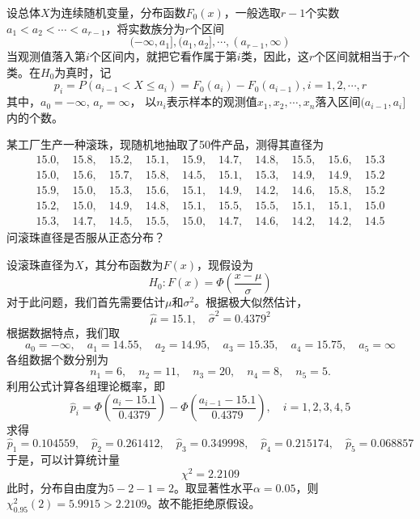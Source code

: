 设总体$X$为连续随机变量，分布函数$F_0(x)$，一般选取$r-1$个实数$a_1<a_2<\cdots<a_{r-1}$，将实数族分为$r$个区间
$$
(-\infty, a_1],(a_1,a_2],\cdots, (a_{r-1},\infty)
$$
当观测值落入第$i$个区间内，就把它看作属于第$i$类，因此，这$r$个区间就相当于$r$个类。在$H_0$为真时，记
$$p_i = P(a_{i-1} < X \leq a_i ) = F_0(a_i) - F_0(a_{i-1}) ,i=1,2,\cdots,r $$
其中，$a_0 = -\infty$, $a_{r} = \infty$， 以$n_i$表示样本的观测值$x_1,x_2,\cdots,x_n$落入区间$(a_{i-1},a_i]$内的个数。
\begin{example}
    某工厂生产一种滚珠，现随机地抽取了50件产品，测得其直径为
    \begin{eqnarray*}
15.0, \quad 15.8, \quad 15.2, \quad 15.1, \quad 15.9, \quad
14.7, \quad 14.8, \quad 15.5, \quad 15.6, \quad 15.3\\
15.0, \quad 15.6, \quad 15.7, \quad 15.8, \quad 14.5, \quad
15.1, \quad 15.3, \quad 14.9, \quad 14.9, \quad 15.2\\
15.9, \quad 15.0, \quad 15.3, \quad 15.6, \quad 15.1, \quad
14.9, \quad 14.2, \quad 14.6, \quad 15.8, \quad 15.2\\
15.2, \quad 15.0, \quad 14.9, \quad 14.8, \quad 15.1, \quad
15.5, \quad 15.5, \quad 15.1, \quad 15.1, \quad 15.0\\
15.3, \quad 14.7, \quad 14.5, \quad 15.5, \quad 15.0, \quad
14.7, \quad 14.6, \quad 14.2, \quad 14.2, \quad 14.5
    \end{eqnarray*}
问滚珠直径是否服从正态分布？
\end{example}
\begin{solution}
    设滚珠直径为$X$，其分布函数为$F(x)$，现假设为
    $$
    H_0 : F(x) = \Phi\left(\frac{x-\mu}{\sigma}\right)
    $$
    对于此问题，我们首先需要估计$\mu$和$\sigma^2$。根据极大似然估计，
    $$
    \hat{\mu} = 15.1,\quad \hat{\sigma}^2 = 0.4379^2
    $$
    根据数据特点，我们取
    $$
    a_0 = -\infty,\quad a_1 = 14.55, \quad a_2 = 14.95, \quad a_3 = 15.35, \quad a_4 = 15.75, \quad a_5 = \infty
    $$
    各组数据个数分别为
    $$
    n_1 = 6, \quad n_2 = 11, \quad n_3 = 20, \quad n_4 = 8,\quad n_5 = 5.
    $$
    利用公式计算各组理论概率，即
    $$
    \hat{p}_i = \Phi\left(\frac{a_i-15.1}{0.4379}\right) -  \Phi\left(\frac{a_{i-1}-15.1}{0.4379}\right) ,\quad i=1,2,3,4,5
    $$
    求得
    $$
    \hat{p}_1 = 0.104559, \quad \hat{p}_2 = 0.261412, \quad \hat{p}_3 = 0.349998, \quad \hat{p}_4 = 0.215174, \quad \hat{p}_5 = 0.068857
    $$
    于是，可以计算统计量
    $$
    \chi^{2} = 2.2109
    $$
    此时，分布自由度为$5-2-1=2$。取显著性水平$\alpha =0.05$，则$\chi^2_{0.95}(2) = 5.9915>2.2109$。故不能拒绝原假设。
\end{solution}
